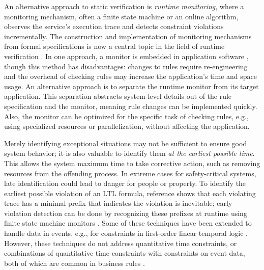 An alternative approach to static verification
is {\em runtime monitoring},
where a monitoring mechanism,
often a finite state machine or an online algorithm,
observes the service's execution trace
and detects constraint violations incrementally.
The construction and implementation of monitoring mechanisms from formal specifications
is now a central topic in the field of runtime verification
\cite{barringer2010runtime,bartocci2018introduction,bartocci2019international}.
In one approach,
a monitor is embedded
in application software
\cite{baresi2005towards,fernando2017monitoring},
though this method has disadvantages:
changes to rules require re-engineering
and
the overhead of checking rules
may increase the application's
time and space usage.
An alternative approach is
to separate the runtime monitor
from its target application.
This separation
abstracts system-level details
out of the rule specification and
the monitor,
meaning rule changes can be implemented quickly.
Also,
the monitor can be optimized
for the specific task of checking rules,
e.g., using specialized resources
or parallelization,
without affecting the application.

Merely identifying exceptional situations
may not be sufficient to ensure good system behavior;
it is also valuable to identify them {\em at the earliest possible time}.
This allows the system maximum time to take corrective action,
such as removing resources from the offending process.
In extreme cases for safety-critical systems,
late identification could lead to danger for people or property.
To identify the earliest possible violation of an LTL formula,
reference \cite{kupferman2001model} shows that
each violating trace has a minimal prefix
that indicates the violation is inevitable;
early violation detection can be done by recognizing these prefixes at runtime
using finite state machine monitors \cite{giannakopoulou2001automata,bauer2011runtime}.
Some of these techniques
have been extended to handle data in events,
e.g., for constraints in 
first-order linear temporal logic \cite{riccardo2014monitoringfsa, bauer2013propositional}.
However,
these techniques do not address 
quantitative time constraints,
or combinations of 
quantitative time constraints
with constraints on event data,
both of which are common in business rules \cite{ly2015compliance}.

